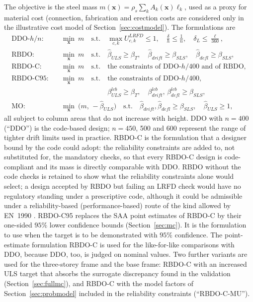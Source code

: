 The objective is the steel mass $m(\mathbf{x}) = \rho_s\sum_k A_k(\mathbf{x})\ell_k$, used as a
proxy for material cost (connection, fabrication and erection costs are considered only in the
illustrative cost model of Section~\ref{sec:costmodel}). The formulations are
\begin{align}
\text{DDO-}h/n:\quad &\min_{\mathbf{x}}\ m\quad\text{s.t.}\quad
\max_{c,k}U^{LRFD}_{c,k}\le1,\quad \frac{\delta}{h}\le\frac{1}{n},\quad \delta_L\le\frac{\ell}{360},\\
\text{RBDO:}\quad &\min_{\mathbf{x}}\ m\quad\text{s.t.}\quad
\hat\beta_{ULS}\ge\beta_T,\quad \hat\beta_{drift}\ge\beta_{SLS},\quad \hat\beta_{defl}\ge\beta_{SLS},\\
\text{RBDO-C:}\quad &\min_{\mathbf{x}}\ m\quad\text{s.t.}\quad\text{the constraints of DDO-}h/400
\text{ and of RBDO},\\
\text{RBDO-C95:}\quad &\min_{\mathbf{x}}\ m\quad\text{s.t.}\quad\text{the constraints of DDO-}h/400,\nonumber\\
&\phantom{\min_{\mathbf{x}}\ m\quad\text{s.t.}\quad}\beta^{lcb}_{ULS}\ge\beta_T,\quad \beta^{lcb}_{drift},\,\beta^{lcb}_{defl}\ge\beta_{SLS},\\
\text{MO:}\quad &\min_{\mathbf{x}}\ \bigl(m,\,-\hat\beta_{ULS}\bigr)\quad\text{s.t.}\quad
\hat\beta_{drift},\hat\beta_{defl}\ge\beta_{SLS},\quad \hat\beta_{ULS}\ge1,
\end{align}
all subject to column areas that do not increase with height. DDO with $n=400$ (``DDO'') is the
code-based design; $n=450$, 500 and 600 represent the range of tighter drift limits used in
practice. RBDO-C is the formulation that a designer bound by the code could adopt: the
reliability constraints are added to, not substituted for, the mandatory checks, so that every
RBDO-C design is code-compliant and its mass is directly comparable with DDO. RBDO without the
code checks is retained to show what the reliability constraints alone would select; a design
accepted by RBDO but failing an LRFD check would have no regulatory standing under a
prescriptive code, although it could be admissible under a reliability-based (performance-based)
route of the kind allowed by EN~1990 \citep{EN1990}. RBDO-C95 replaces the SAA point estimates of RBDO-C by their
one-sided $95\%$ lower confidence bounds (Section~\ref{sec:mc}). It is the formulation to use when
the target is to be demonstrated with $95\%$ confidence. The point-estimate formulation RBDO-C is used
for the like-for-like comparisons with DDO, because DDO, too, is judged on nominal values. Two
further variants are used for the three-storey frame and the base frame: RBDO-C with an increased
ULS target that absorbs the surrogate discrepancy found in the validation (Section~\ref{sec:fullmc}),
and RBDO-C with the model factors of Section~\ref{sec:probmodel} included in the reliability
constraints (``RBDO-C-MU'').

